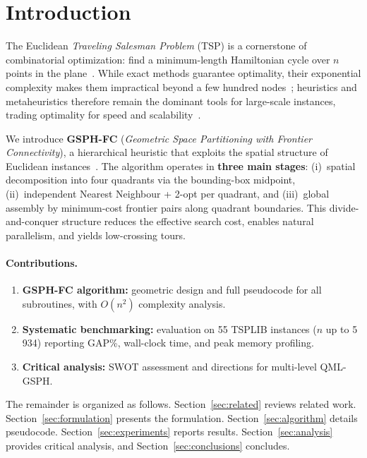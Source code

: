 \documentclass[runningheads]{llncs}
\begin{document}
\section{Introduction}

The Euclidean \textit{Traveling Salesman Problem} (TSP) is a
cornerstone of combinatorial optimization: find a minimum-length
Hamiltonian cycle over $n$ points in the plane~\cite{applegate2006tsp,laporte1992tsp}.
While exact methods guarantee optimality, their exponential
complexity makes them impractical beyond a few hundred
nodes~\cite{garey1979computers}; heuristics and metaheuristics
therefore remain the dominant tools for large-scale instances,
trading optimality for speed and scalability~\cite{mardones2023}.

We introduce \textbf{GSPH-FC} (\textit{Geometric Space Partitioning
with Frontier Connectivity}), a hierarchical heuristic that exploits
the spatial structure of Euclidean instances~\cite{karp1977probabilistic}. The algorithm operates
in \textbf{three main stages}: (i)~spatial decomposition into four
quadrants via the bounding-box midpoint, (ii)~independent Nearest
Neighbour + 2-opt per quadrant, and (iii)~global assembly by
minimum-cost frontier pairs along quadrant boundaries. This
divide-and-conquer structure reduces the effective search cost,
enables natural parallelism, and yields low-crossing tours.

\paragraph{Contributions.}
\begin{enumerate}
  \item \textbf{GSPH-FC algorithm:} geometric design and full
    pseudocode for all subroutines, with $O(n^2)$ complexity
    analysis.
  \item \textbf{Systematic benchmarking:} evaluation on 55 TSPLIB
    instances ($n$ up to 5\,934) reporting GAP\%, wall-clock time,
    and peak memory profiling.
  \item \textbf{Critical analysis:} SWOT assessment and directions
    for multi-level QML-GSPH.
\end{enumerate}

The remainder is organized as follows. Section~\ref{sec:related}
reviews related work. Section~\ref{sec:formulation} presents the
formulation. Section~\ref{sec:algorithm} details pseudocode.
Section~\ref{sec:experiments} reports results.
Section~\ref{sec:analysis} provides critical analysis, and
Section~\ref{sec:conclusions} concludes.
\end{document}
